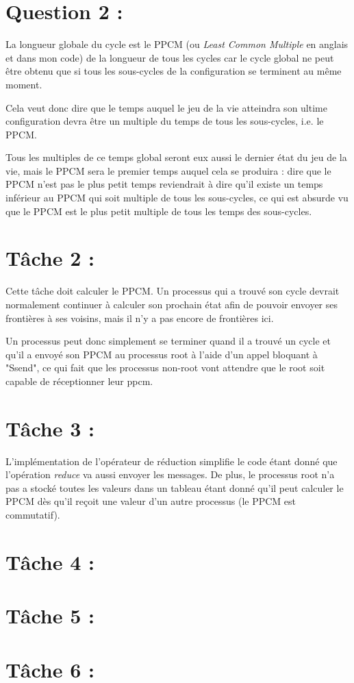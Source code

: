 \documentclass{article}
\begin{document}
\section*{Question 2 :}

La longueur globale du cycle est le PPCM (ou \textit{Least Common Multiple} en anglais et dans mon code) de la longueur de tous les cycles car le cycle global ne peut être obtenu que si tous les sous-cycles de la configuration se terminent au même moment.

Cela veut donc dire que le temps auquel le jeu de la vie atteindra son ultime configuration devra être un multiple du temps de tous les sous-cycles, i.e. le PPCM.

\medskip

Tous les multiples de ce temps global seront eux aussi le dernier état du jeu de la vie, mais le PPCM sera le premier temps auquel cela se produira : dire que le PPCM n'est pas le plus petit temps reviendrait à dire qu'il existe un temps inférieur au PPCM qui soit multiple de tous les sous-cycles, ce qui est absurde vu que le PPCM est le plus petit multiple de tous les temps des sous-cycles.

\section*{Tâche 2 :}

Cette tâche doit calculer le PPCM.
Un processus qui a trouvé son cycle devrait normalement continuer à calculer son prochain état afin de pouvoir envoyer ses frontières à ses voisins, mais il n'y a pas encore de frontières ici.

Un processus peut donc simplement se terminer quand il a trouvé un cycle et qu'il a envoyé son PPCM au processus root à l'aide d'un appel bloquant à "Ssend", ce qui fait que les processus non-root vont attendre que le root soit capable de réceptionner leur ppcm.

\section*{Tâche 3 :}

L'implémentation de l'opérateur de réduction simplifie le code étant donné que l'opération \textit{reduce} va aussi envoyer les messages.
De plus, le processus root n'a pas a stocké toutes les valeurs dans un tableau étant donné qu'il peut calculer le PPCM dès qu'il reçoit une valeur d'un autre processus (le PPCM est commutatif).

\section*{Tâche 4 :}
\section*{Tâche 5 :}
\section*{Tâche 6 :}
\end{document}

